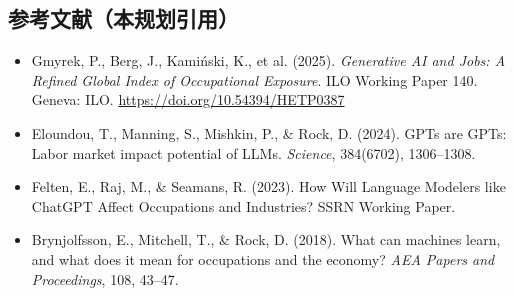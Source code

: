 \documentclass[12pt,a4paper]{ctexart}
\begin{document}
\subsection*{参考文献（本规划引用）}

\begin{itemize}
    \item Gmyrek, P., Berg, J., Kamiński, K., et al. (2025).
    \textit{Generative AI and Jobs: A Refined Global Index of Occupational Exposure}.
    ILO Working Paper 140. Geneva: ILO. \url{https://doi.org/10.54394/HETP0387}

    \item Eloundou, T., Manning, S., Mishkin, P., \& Rock, D. (2024).
    GPTs are GPTs: Labor market impact potential of LLMs.
    \textit{Science}, 384(6702), 1306--1308.

    \item Felten, E., Raj, M., \& Seamans, R. (2023).
    How Will Language Modelers like ChatGPT Affect Occupations and Industries?
    SSRN Working Paper.

    \item Brynjolfsson, E., Mitchell, T., \& Rock, D. (2018).
    What can machines learn, and what does it mean for occupations and the economy?
    \textit{AEA Papers and Proceedings}, 108, 43--47.
\end{itemize}
\end{document}
